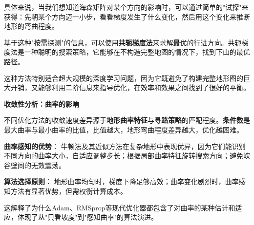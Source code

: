 具体来说，当我们想知道海森矩阵对某个方向的影响时，可以通过简单的"试探"来获得：先朝某个方向迈一小步，看看梯度发生了什么变化，然后用这个变化来推断地形的弯曲程度。

基于这种"按需探测"的信息，可以使用\textbf{共轭梯度法}来求解最优的行进方向。共轭梯度法是一种聪明的搜索策略，它能够在不构造完整地图的情况下，找到下山的最优路径。

这种方法特别适合超大规模的深度学习问题，因为它既避免了构建完整地形图的巨大开销，又能够利用二阶信息来指导优化，在效率和效果之间找到了很好的平衡。

\textbf{收敛性分析：曲率的影响}

不同优化方法的收敛速度差异源于\textbf{地形曲率特征}与\textbf{寻路策略}的匹配程度。\textbf{条件数}是最大曲率与最小曲率的比值，比值越大，地形弯曲程度差异越大，优化越困难。

\textbf{曲率感知的优势}：
牛顿法及其近似方法在复杂地形中表现优异，因为它们能识别不同方向的曲率大小，自适应调整步长；根据局部曲率特征旋转搜索方向；避免峡谷壁间的无效震荡。

\textbf{算法选择原则}：
地形曲率均匀时，梯度下降足够高效；曲率变化剧烈时，曲率感知方法有显著优势，但需权衡计算成本。

这解释了为什么Adam、RMSprop等现代优化器都包含了对曲率的某种估计和适应，体现了从"只看坡度"到"感知曲率"的算法演进。